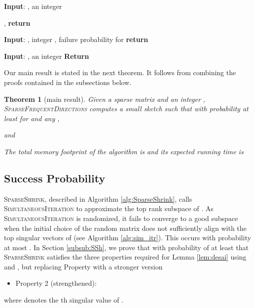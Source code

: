 \documentclass[11pt]{article}
\newcommand{\sfd}{\textsc{SparseFrequentDirections}\xspace}
\newcommand{\si}{\textsc{SimultaneousIteration}\xspace}
\newcommand{\SSh}{\textsc{SparseShrink}\xspace}
\newcommand{\BSSh}{\textsc{BoostedSparseShrink}\xspace}
\newtheorem{theorem}{Theorem}[section]
\begin{document}
\begin{algorithm}[H]
\begin{algorithmic}
\caption{\textsc{SparseShrink}}
\label{alg:SparseShrink}
\STATE \textbf{Input}: , an integer 

  \STATE  
  \STATE , \;  
  \STATE 
  \STATE  
\STATE \textbf{return} 
\end{algorithmic}
\end{algorithm}



\begin{algorithm}[H]
\begin{algorithmic}
\caption{\BSSh}
\label{alg:BoostedSparseShrink}
\STATE \textbf{Input}: , integer , failure probability 
  \STATE 
  \STATE  \;\;\; for 
  \IF {}
    \STATE \textbf{return} 
  \ENDIF
\ENDWHILE
\end{algorithmic}
\end{algorithm}


\begin{algorithm}[H]
\caption{\textsc{DenseShrink}}
\label{alg:DenseFD}
\begin{algorithmic}
\STATE \textbf{Input}: , an integer 
\STATE  \STATE \STATE 
\STATE \textbf{Return}  \end{algorithmic}
\end{algorithm}





Our main result is stated in the next theorem. It follows from combining the proofs contained in the subsections below.
\begin{theorem}[main result]\label{thm:bounds}
Given a sparse matrix  and an integer , \sfd computes a small sketch  such that with probability at least  for  and any ,

and

The total memory footprint of the algorithm is  and its expected running time is 

\end{theorem}


\subsection{Success Probability}
\label{sec:suc-prob}
\SSh, described in Algorithm \ref{alg:SparseShrink}, calls \si to approximate the top rank  subspace of .
As \si is randomized, it fails to converge to a good subspace when the initial choice of the random matrix  does not sufficiently align with the top  singular vectors of  (see Algorithm \ref{alg:sim_itr}). This occurs with probability at most .
In Section \ref{subsub:SSh}, we prove that with probability of at least  that \SSh satisfies the three properties required for Lemma \ref{lem:desai} using  and , but replacing Property  with a stronger version
\begin{itemize}
\item Property 2 (strengthened):  

\end{itemize}
where  denotes the th singular value of .
\end{document}
